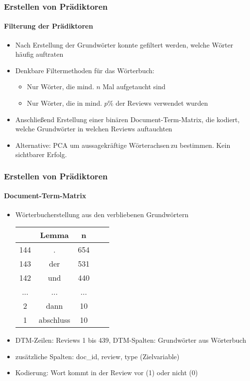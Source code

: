 \begin{frame}
\frametitle{Erstellen von Prädiktoren}
\framesubtitle{Filterung der Prädiktoren}
\begin{itemize}\itemsep12pt
\item Nach Erstellung der Grundwörter konnte gefiltert werden, welche Wörter häufig auftraten
\item Denkbare Filtermethoden für das Wörterbuch:
\begin{itemize}
\item Nur Wörter, die mind. $n$ Mal aufgetaucht sind 
\item Nur Wörter, die in mind. $p\%$ der Reviews verwendet wurden
\end{itemize} 
\item Anschließend Erstellung einer binären Document-Term-Matrix, die kodiert, welche Grundwörter in welchen Reviews auftauchten
\item Alternative: PCA um aussagekräftige \glqq Wörterachsen\grqq \,zu bestimmen. Kein sichtbarer Erfolg.
\end{itemize}
\end{frame}

\begin{frame}
\frametitle{Erstellen von Prädiktoren}
\framesubtitle{Document-Term-Matrix}
\begin{itemize}\itemsep12pt
\item Wörterbucherstellung aus den verbliebenen Grundwörtern\\
\begin{center}
\begin{tabular}{|c|c|c|c|c|}
\hline
		& Lemma 	& n	\\
\hline
144 	& .		& 654\\
143	 	& der	& 531\\
142 	& und	& 440\\
...		& ...	& ...\\
2		& dann & 10\\
1		& abschluss & 10\\
\hline
\end{tabular}
 \end{center}

\item DTM-Zeilen: Reviews 1 bis 439, DTM-Spalten: Grundwörter aus Wörterbuch
\item zusätzliche Spalten: doc\_id, review, type (Zielvariable) 
\item Kodierung: Wort kommt in der Review vor (1) oder nicht (0)
\end{itemize}
\end{frame}

